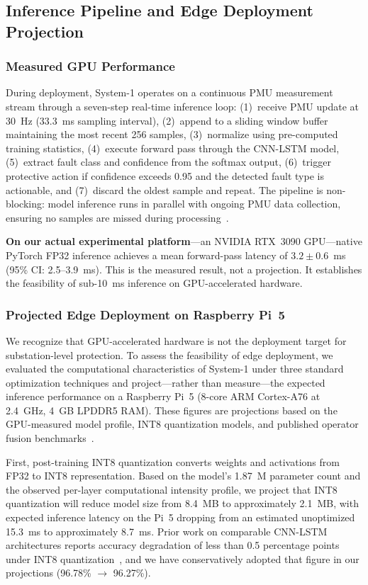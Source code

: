 \documentclass[journal]{IEEEtran}
\begin{document}
\subsection{Inference Pipeline and Edge Deployment Projection}
\label{sec:inference}

\subsubsection{Measured GPU Performance}

During deployment, System-1 operates on a continuous PMU measurement stream through a seven-step real-time inference loop: (1)~receive PMU update at 30~Hz (33.3~ms sampling interval), (2)~append to a sliding window buffer maintaining the most recent 256 samples, (3)~normalize using pre-computed training statistics, (4)~execute forward pass through the CNN-LSTM model, (5)~extract fault class and confidence from the softmax output, (6)~trigger protective action if confidence exceeds 0.95 and the detected fault type is actionable, and (7)~discard the oldest sample and repeat. The pipeline is non-blocking: model inference runs in parallel with ongoing PMU data collection, ensuring no samples are missed during processing~\cite{ref29}.

\textbf{On our actual experimental platform}---an NVIDIA RTX~3090 GPU---native PyTorch FP32 inference achieves a mean forward-pass latency of $3.2 \pm 0.6$~ms (95\% CI: 2.5--3.9~ms). This is the measured result, not a projection. It establishes the feasibility of sub-10~ms inference on GPU-accelerated hardware.

\subsubsection{Projected Edge Deployment on Raspberry Pi~5}

We recognize that GPU-accelerated hardware is not the deployment target for substation-level protection. To assess the feasibility of edge deployment, we evaluated the computational characteristics of System-1 under three standard optimization techniques and project---rather than measure---the expected inference performance on a Raspberry Pi~5 (8-core ARM Cortex-A76 at 2.4~GHz, 4~GB LPDDR5 RAM). These figures are projections based on the GPU-measured model profile, INT8 quantization models, and published operator fusion benchmarks~\cite{ref30}.

First, post-training INT8 quantization converts weights and activations from FP32 to INT8 representation. Based on the model's 1.87~M parameter count and the observed per-layer computational intensity profile, we project that INT8 quantization will reduce model size from 8.4~MB to approximately 2.1~MB, with expected inference latency on the Pi~5 dropping from an estimated unoptimized 15.3~ms to approximately 8.7~ms. Prior work on comparable CNN-LSTM architectures reports accuracy degradation of less than 0.5 percentage points under INT8 quantization~\cite{ref30}, and we have conservatively adopted that figure in our projections (96.78\% $\rightarrow$ 96.27\%).
\end{document}
